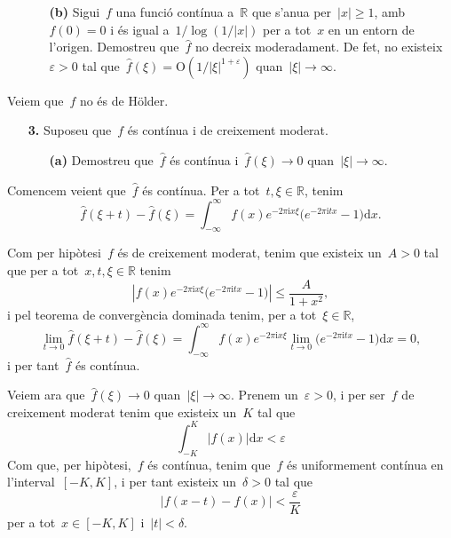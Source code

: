 \documentclass[a4paper]{article}
\theoremstyle{definition}
\newcommand{\iu}{\mathrm{i}}
\newcommand{\uppi}{\pi}
\newcommand{\diff}{\mathrm{d}}
\newcommand{\abs}[1]{\lvert{#1}\rvert}
\newcommand{\Abs}[1]{\left\lvert{#1}\right\rvert}
\begin{document}
\begin{enumerate}
    \item[]\begin{enumerate}
        \item[\textbf{(b)}] Sigui~\(f\) una funció contínua a~\(\mathbb{R}\) que
            s'anu{\lgem}a per~\(\abs{x}\geq1\), amb~\(f(0)=0\) i és igual
            a~\(1/\log(1/\abs{x})\) per a tot~\(x\) en un entorn de l'origen.
            Demostreu que~\(\widehat{f}\) no decreix moderadament.
            De fet, no existeix~\(\varepsilon>0\) tal que~\(\widehat{f}(\xi) =
            \textrm{O}(1/\abs{\xi}^{1+\varepsilon})\)
            quan~\(\abs{\xi}\to\infty\).
    \end{enumerate}
\end{enumerate}

Veiem que~\(f\) no és de H\"older.

\begin{enumerate}
    \item[\textbf{3.}] Suposeu que~\(f\) és contínua i de creixement moderat.
        \begin{enumerate}
            \item[\textbf{(a)}] Demostreu que~\(\widehat{f}\) és contínua
                i~\(\widehat{f}(\xi)\to0\) quan~\(\abs{\xi}\to\infty\).
        \end{enumerate}
\end{enumerate}

Comencem veient que~\(\widehat{f}\) és contínua.
Per a tot~\(t,\xi\in\mathbb{R}\), tenim
\[
    \widehat{f}(\xi + t)-\widehat{f}(\xi)
    =
    \int_{-\infty}^{\infty}
    f(x)
    e^{-2\uppi\iu x\xi}
    \bigl(
        e^{-2\uppi\iu tx} - 1
    \bigr)
    \diff x.
\]

Com per hipòtesi~\(f\) és de creixement moderat, tenim que existeix un~\(A>0\)
tal que per a tot~\(x,t,\xi\in\mathbb{R}\) tenim
\[
    \Abs{f(x)
    e^{-2\uppi\iu x\xi}
    \bigl(
        e^{-2\uppi\iu tx} - 1
    \bigr)
}
    \leq
    \frac{A}{1+x^{2}},
\]
i pel teorema de convergència dominada tenim, per a tot~\(\xi\in\mathbb{R}\),
\[
    \lim_{t\to0} \widehat{f}(\xi + t)-\widehat{f}(\xi)
    =
    \int_{-\infty}^{\infty}
    f(x)
    e^{-2\uppi\iu x\xi}
    \lim_{t\to0}
    \bigl(
        e^{-2\uppi\iu tx} - 1
    \bigr)
    \diff x
    = 0,
\]
i per tant~\(\widehat{f}\) és contínua.

Veiem ara que~\(\widehat{f}(\xi)\to0\) quan~\(\abs{\xi}\to\infty\).
Prenem un~\(\varepsilon>0\), i per ser~\(f\) de creixement moderat tenim que
existeix un~\(K\) tal que
\[
    \int_{-K}^{K} \abs{f(x)} \diff x < \varepsilon
\]
Com que, per hipòtesi,~\(f\) és contínua, tenim que~\(f\) és uniformement
contínua en l'interval~\([-K,K]\), i per tant existeix un~\(\delta>0\) tal que
\[
    \abs{f(x - t) - f(x)} < \frac{\varepsilon}{K}
\]
per a tot~\(x\in[-K,K]\) i~\(\abs{t}<\delta\).
\end{document}
